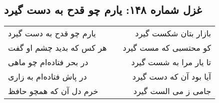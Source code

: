 \begin{center}
\section*{غزل شماره ۱۴۸: یارم چو قدح به دست گیرد}
\label{sec:sh148}
\begin{longtable}{l p{0.5cm} r}
یارم چو قدح به دست گیرد
&&
بازار بتان شکست گیرد
\\
هر کس که بدید چشم او گفت
&&
کو محتسبی که مست گیرد
\\
در بحر فتاده‌ام چو ماهی
&&
تا یار مرا به شست گیرد
\\
در پاش فتاده‌ام به زاری
&&
آیا بود آن که دست گیرد
\\
خرم دل آن که همچو حافظ
&&
جامی ز می الست گیرد
\\
\end{longtable}
\end{center}
